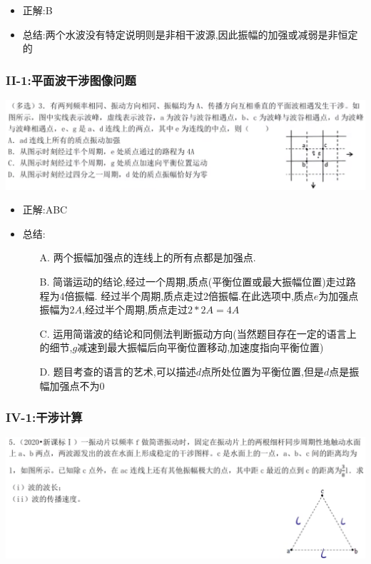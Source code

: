 \documentclass{article}
\begin{document}
\begin{itemize}
    \item 正解:\quad B
    \item 总结:\quad 两个水波没有特定说明则是非相干波源,因此振幅的加强或减弱是非恒定的
\end{itemize}

\vspace{2em}

\subsubsection{II-1:平面波干涉图像问题}
\includegraphics[width = 50em]{./pictures/2.1-3.png}

\begin{itemize}
    \item 正解:\quad ABC
    \item 总结:\quad
          \begin{itemize}
              \item[A.] 两个振幅加强点的连线上的所有点都是加强点.
              \item[B.] 简谐运动的结论,经过一个周期,质点(平衡位置或最大振幅位置)走过路程为4倍振幅.
                  经过半个周期,质点走过2倍振幅.在此选项中,质点$e$为加强点振幅为$2A$,经过半个周期,质点走过$2*2A = 4A$
              \item[C.] 运用简谐波的结论和同侧法判断振动方向(当然题目存在一定的语言上的细节,$g$减速到最大振幅后向平衡位置移动,加速度指向平衡位置)
              \item[D.] 题目考查的语言的艺术,可以描述$d$点所处位置为平衡位置,但是$d$点是振幅加强点不为$0$
          \end{itemize}
\end{itemize}

\vspace{2em}

\subsubsection{IV-1:干涉计算}
\includegraphics[width = 50em]{./pictures/2.1-4.png}
\end{document}
